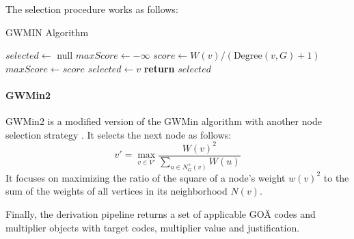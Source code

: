 The selection procedure works as follows:

\begin{algorithm}
    \caption{GWMIN Algorithm}
    \begin{algorithmic}[1]
            \State $selected \gets$ null
            \State $maxScore \gets -\infty$
                \State $score \gets W(v) / (\text{Degree}(v, G) + 1)$
                    \State $maxScore \gets score$
                    \State $selected \gets v$
                \EndIf
            \EndFor
            \State \textbf{return} $selected$
        \EndProcedure
    \end{algorithmic}\label{alg:algorithm-gwin-selection}
\end{algorithm}


\paragraph{GWMin2}
GWMin2 is a modified version of the GWMin algorithm with another node selection strategy \cite{SAKAI2003313}.
It selects the next node as follows:
\[
    v' = \max_{v \in V'} \frac{W(v)^2}{\sum_{u \in N_G^+(v)} W(u)}
\]
It focuses
on maximizing the ratio of the square of a node's weight $w\left(v\right)^2$ to the sum of the weights of all vertices in its neighborhood $N\left(v\right)$.


Finally, the derivation pipeline returns a set of applicable GOÄ codes and multiplier objects with target codes, multiplier value and justification.
